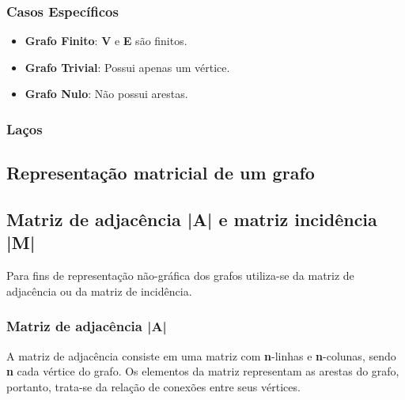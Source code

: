 \documentclass[a4paper, 12pt]{article}
\begin{document}
\subsubsection{Casos Específicos}

\begin{itemize}
	\item\textbf{Grafo Finito}:  \textbf{V} e \textbf{E} são finitos.
	\item\textbf{Grafo Trivial}: Possui apenas um vértice.
	\item\textbf{Grafo Nulo}: Não possui arestas.
\end{itemize}

\subsubsection{Laços}
\subsection{Representação matricial de um grafo}
\subsection{Matriz de adjacência |A| e matriz incidência |M| }

    Para fins de representação não-gráfica dos grafos utiliza-se da matriz de adjacência ou da matriz de incidência.
    
\subsubsection{Matriz de adjacência |A|}

    A matriz de adjacência consiste em uma matriz com \textbf{n}-linhas e \textbf{n}-colunas, sendo \textbf{n} cada vértice do grafo. Os elementos da matriz representam as arestas do grafo, portanto, trata-se da relação de conexões entre seus vértices.
    
    \vspace{0.5in}
    
\end{document}
